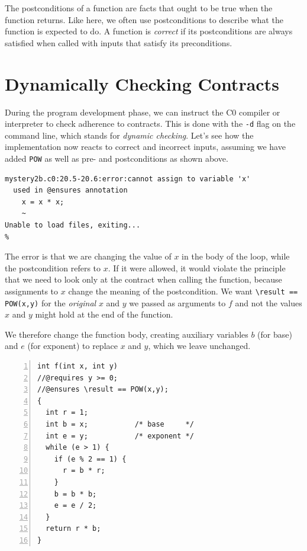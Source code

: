 The postconditions of a function are facts that ought to be true
when the function returns.  Like here, we often use postconditions to
describe what the function is expected to do.  A function is
\emph{correct} if its postconditions are always satisfied when called
with inputs that satisfy its preconditions.


\clearpage
\section{Dynamically Checking Contracts}
\label{sec:contracts:dynamic_checking}

During the program development phase, we can instruct the C0 compiler
or interpreter to check adherence to contracts.  This is done with the
\lstinline'-d' flag on the command line, which stands for \emph{dynamic
  checking}.  Let's see how the implementation now reacts to correct
and incorrect inputs, assuming we have added \lstinline'POW' as well
as pre- and postconditions as shown above.
\begin{lstlisting}[language={[coin]C}]
% coin mystery2b.c0 -d
mystery2b.c0:20.5-20.6:error:cannot assign to variable 'x'
  used in @ensures annotation
    x = x * x;
    ~
Unable to load files, exiting...
%
\end{lstlisting}
The error is that we are changing the value of $x$ in the body of the
loop, while the postcondition refers to $x$.  If it were allowed, it
would violate the principle that we need to look only at the contract
when calling the function, because assignments to $x$ change the
meaning of the postcondition.  We want \lstinline'\result == POW(x,y)' for
the \emph{original} $x$ and $y$ we passed as arguments to $f$ and not
the values $x$ and $y$ might hold at the end of the function.

We therefore change the function body, creating auxiliary variables
$b$ (for base) and $e$ (for exponent) to replace $x$ and $y$, which
we leave unchanged.

\begin{lstlisting}[language={[C0]C}, numbers=left]
int f(int x, int y)
//@requires y >= 0;
//@ensures \result == POW(x,y);
{
  int r = 1;
  int b = x;           /* base     */
  int e = y;           /* exponent */
  while (e > 1) {
    if (e % 2 == 1) {
      r = b * r;
    }
    b = b * b;
    e = e / 2;
  }
  return r * b;
}
\end{lstlisting}

